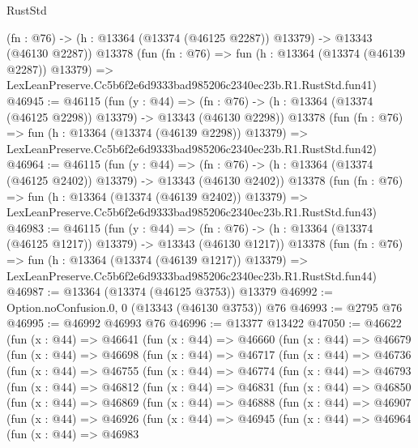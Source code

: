 \begin{lexlean}{RustStd}
\begin{coremodule}
    (fn : @76) -> (h : @13364 (@13374 (@46125 @2287)) @13379) -> @13343 (@46130 @2287))
    @13378
    (fun (fn : @76) =>
    fun (h : @13364 (@13374 (@46139 @2287)) @13379) =>
    LexLeanPreserve.Cc5b6f2e6d9333bad985206c2340ec23b.R1.RustStd.fun41)
@46945 := @46115
    (fun (y : @44) =>
    (fn : @76) -> (h : @13364 (@13374 (@46125 @2298)) @13379) -> @13343 (@46130 @2298))
    @13378
    (fun (fn : @76) =>
    fun (h : @13364 (@13374 (@46139 @2298)) @13379) =>
    LexLeanPreserve.Cc5b6f2e6d9333bad985206c2340ec23b.R1.RustStd.fun42)
@46964 := @46115
    (fun (y : @44) =>
    (fn : @76) -> (h : @13364 (@13374 (@46125 @2402)) @13379) -> @13343 (@46130 @2402))
    @13378
    (fun (fn : @76) =>
    fun (h : @13364 (@13374 (@46139 @2402)) @13379) =>
    LexLeanPreserve.Cc5b6f2e6d9333bad985206c2340ec23b.R1.RustStd.fun43)
@46983 := @46115
    (fun (y : @44) =>
    (fn : @76) -> (h : @13364 (@13374 (@46125 @1217)) @13379) -> @13343 (@46130 @1217))
    @13378
    (fun (fn : @76) =>
    fun (h : @13364 (@13374 (@46139 @1217)) @13379) =>
    LexLeanPreserve.Cc5b6f2e6d9333bad985206c2340ec23b.R1.RustStd.fun44)
@46987 := @13364 (@13374 (@46125 @3753)) @13379
@46992 := Option.noConfusion.{0, 0} (@13343 (@46130 @3753)) @76
@46993 := @2795 @76
@46995 := @46992 @46993 @76
@46996 := @13377 @13422
@47050 := @46622
    (fun (x : @44) =>
    @46641
      (fun (x : @44) =>
      @46660
        (fun (x : @44) =>
        @46679
          (fun (x : @44) =>
          @46698
            (fun (x : @44) =>
            @46717
              (fun (x : @44) =>
              @46736
                (fun (x : @44) =>
                @46755
                  (fun (x : @44) =>
                  @46774
                    (fun (x : @44) =>
                    @46793
                      (fun (x : @44) =>
                      @46812
                        (fun (x : @44) =>
                        @46831
                          (fun (x : @44) =>
                          @46850
                            (fun (x : @44) =>
                            @46869
                              (fun (x : @44) =>
                              @46888
                                (fun (x : @44) =>
                                @46907
                                  (fun (x : @44) =>
                                  @46926
                                    (fun (x : @44) =>
                                    @46945
                                      (fun (x : @44) =>
                                      @46964
                                        (fun (x : @44) =>
                                        @46983

\end{coremodule}
\end{lexlean}
